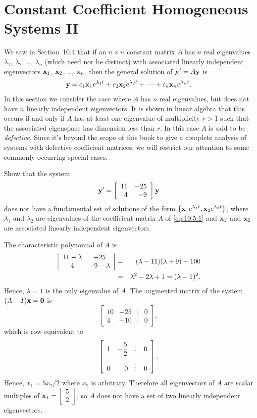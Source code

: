 \section{Constant Coefficient Homogeneous Systems II}

\noindent
We saw in Section~10.4 that if an $n\times n$ constant matrix $A$ has $n$ real eigenvalues
$\lambda_{1}$, $\lambda_{2}$, \dots, $\lambda_{n}$ (which need not be distinct) with associated
linearly independent eigenvectors ${\bf x}_{1}$, ${\bf x}_{2}$, \dots, ${\bf x}_{n}$, then the
general solution of ${\bf y}'=A{\bf y}$ is
\[
  {\bf y}=c_{1}{\bf x}_{1}e^{\lambda_{1}t}+c_{2}{\bf x}_{2}e^{\lambda_{2}t}+\cdots+c_{n}{\bf x}_{n}e^{\lambda_{n}t}.
\]
In this section we consider the case where $A$ has $n$ real eigenvalues, but does not have $n$
linearly independent eigenvectors. It is shown in linear algebra that this occurs if and only if $A$
has at least one eigenvalue of multiplicity $r>1$ such that the associated eigenspace has dimension
less than $r$. In this case $A$ is said to be {\color{blue}\it defective\/}. Since it's beyond the
scope of this book to give a complete analysis of systems with defective coefficient matrices, we
will restrict our attention to some commonly occurring special cases.

\begin{example}
  \label{example:10.5.1}\rm \space Show that the system
  \begin{equation}
    \label{eq:10.5.1}{\bf y}'=\left[\begin{array}{rr} 11&-25\\4&-9\end{array}\right]{\bf y}
  \end{equation}
  does not have a fundamental set of solutions of the form
  $\{{\bf x}_{1}e^{\lambda_{1}t},{\bf x}_{2}e^{\lambda_{2}t}\}$, where $\lambda_{1}$ and
  $\lambda_{2}$ are eigenvalues of the coefficient matrix $A$ of \eqref{eq:10.5.1} and
  ${\bf x}_{1}$ and ${\bf x}_{2}$ are associated linearly independent eigenvectors.
\end{example}

\begin{examplesolution}
\solution The characteristic polynomial of $A$ is
\begin{eqnarray*}
  \left|\begin{array}{cc} 11-\lambda&-25\\4&-9-\lambda\end{array}\right| & = & (\lambda-11)(\lambda+9)+100 \\
                         & = & \lambda^{2}-2\lambda+1=(\lambda-1)^{2}.
\end{eqnarray*}
Hence, $\lambda=1$ is the only eigenvalue of $A$. The augmented matrix of the system
$(A-I){\bf x}={\bf0}$ is
\[
  \left[
  \begin{array}{rrcr}
    10 & -25 & \vdots & 0 \\
    4  & -10 & \vdots & 0
  \end{array}\right],
\]
which is row equivalent to
\[
  \left[
  \begin{array}{rrcr}
    1 & -\displaystyle\frac{5}{2} & \vdots & 0 \\[10pt]
    0 & 0                & \vdots & 0
  \end{array}\right].
\]
Hence, $x_{1}=5x_{2}/2$ where $x_{2}$ is arbitrary. Therefore all eigenvectors of $A$ are scalar
multiples of ${\bf x}_{1}=\displaystyle{\left[\begin{array}{l}5\\2\end{array}\right]}$, so $A$ does not have a set of two linearly independent
eigenvectors. \bbox
\end{examplesolution}


